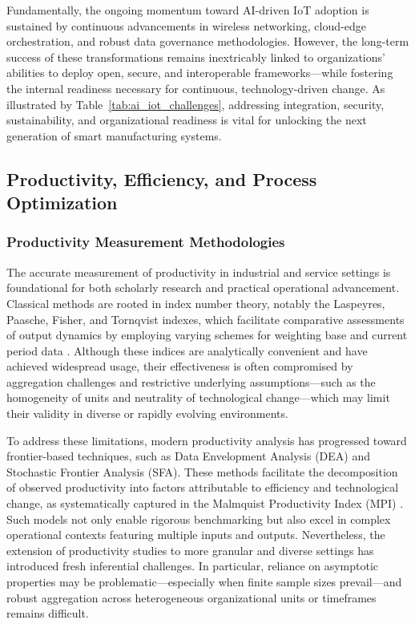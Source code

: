 \documentclass[sigconf]{acmart}
\begin{document}
Fundamentally, the ongoing momentum toward AI-driven IoT adoption is sustained by continuous advancements in wireless networking, cloud-edge orchestration, and robust data governance methodologies. However, the long-term success of these transformations remains inextricably linked to organizations' abilities to deploy open, secure, and interoperable frameworks—while fostering the internal readiness necessary for continuous, technology-driven change. As illustrated by Table~\ref{tab:ai_iot_challenges}, addressing integration, security, sustainability, and organizational readiness is vital for unlocking the next generation of smart manufacturing systems.

\subsection{Productivity, Efficiency, and Process Optimization}

\subsubsection{Productivity Measurement Methodologies}

The accurate measurement of productivity in industrial and service settings is foundational for both scholarly research and practical operational advancement. Classical methods are rooted in index number theory, notably the Laspeyres, Paasche, Fisher, and Tornqvist indexes, which facilitate comparative assessments of output dynamics by employing varying schemes for weighting base and current period data \cite{ref86}. Although these indices are analytically convenient and have achieved widespread usage, their effectiveness is often compromised by aggregation challenges and restrictive underlying assumptions—such as the homogeneity of units and neutrality of technological change—which may limit their validity in diverse or rapidly evolving environments.

To address these limitations, modern productivity analysis has progressed toward frontier-based techniques, such as Data Envelopment Analysis (DEA) and Stochastic Frontier Analysis (SFA). These methods facilitate the decomposition of observed productivity into factors attributable to efficiency and technological change, as systematically captured in the Malmquist Productivity Index (MPI) \cite{ref86}. Such models not only enable rigorous benchmarking but also excel in complex operational contexts featuring multiple inputs and outputs. Nevertheless, the extension of productivity studies to more granular and diverse settings has introduced fresh inferential challenges. In particular, reliance on asymptotic properties may be problematic—especially when finite sample sizes prevail—and robust aggregation across heterogeneous organizational units or timeframes remains difficult.
\end{document}

